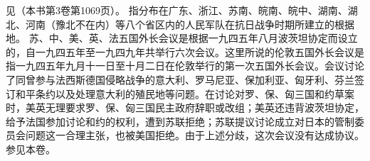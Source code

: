 \begin{maonote}
见（本书第3卷第1069页）。
指分布在广东、浙江、苏南、皖南、皖中、湖南、湖北、河南（豫北不在内）等八个省区内的人民军队在抗日战争时期所建立的根据地。
苏、中、美、英、法五国外长会议是根据一九四五年八月波茨坦协定而设立的，自一九四五年至一九四九年共举行六次会议。这里所说的伦敦五国外长会议是指一九四五年九月十一日至十月二日在伦敦举行的第一次五国外长会议。会议讨论了同曾参与法西斯德国侵略战争的意大利、罗马尼亚、保加利亚、匈牙利、芬兰签订和平条约以及处理意大利的殖民地等问题。在讨论对罗、保、匈三国和约草案时，美英无理要求罗、保、匈三国民主政府辞职或改组；美英还违背波茨坦协定，给予法国参加讨论和约的权利，遭到苏联拒绝；苏联提议讨论成立对日本的管制委员会问题这一合理主张，也被美国拒绝。由于上述分歧，这次会议没有达成协议。
参见本卷。
\end{maonote}
